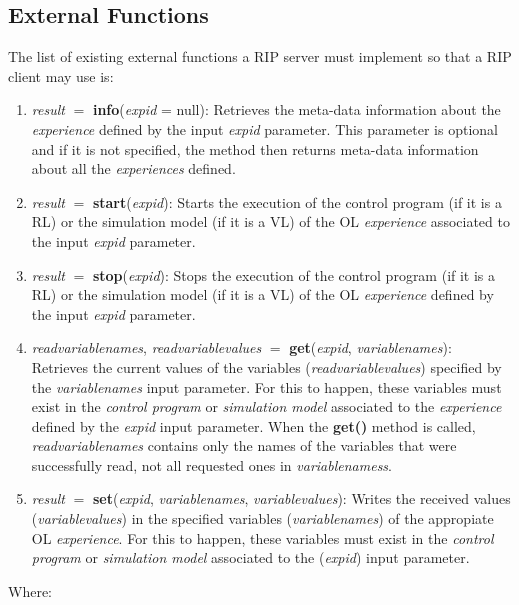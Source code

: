 \subsection{External Functions}
\label{sec:External_Functions}
The list of existing external functions a RIP server must implement so that a RIP client may use is:

\begin{enumerate}
    \item \textit{result} $=$ \textbf{info}(\textit{expid} = null): Retrieves the meta-data information about the \textit{experience} defined by the input \textit{expid} parameter.  This parameter is optional and if it is not specified, the method then returns meta-data information about all the \textit{experiences} defined.
    \item \textit{result} $=$ \textbf{start}(\textit{expid}): Starts the execution of the control program (if it is a RL) or the simulation model (if it is a VL) of the OL \textit{experience} associated to the input \textit{expid} parameter.
    \item \textit{result} $=$ \textbf{stop}(\textit{expid}): Stops the execution of the control program (if it is a RL) or the simulation model (if it is a VL) of the OL \textit{experience} defined by the input \textit{expid} parameter.
    \item \textit{readvariablenames}, \textit{readvariablevalues} $=$ \textbf{get}(\textit{expid}, \textit{variablenames}): Retrieves the current values of the variables (\textit{readvariablevalues}) specified by the \textit{variablenames} input parameter. For this to happen, these variables must exist in the \textit{control program} or \textit{simulation model} associated to the \textit{experience} defined by the \textit{expid} input parameter. When the \textbf{get()} method is called, \textit{readvariablenames} contains only the names of the variables that were successfully read, not all requested ones in \textit{variablenamess}.
    \item \textit{result} $=$ \textbf{set}(\textit{expid}, \textit{variablenames}, \textit{variablevalues}): Writes the received values (\textit{variablevalues}) in the specified variables (\textit{variablenames}) of the appropiate OL \textit{experience}. For this to happen, these variables must exist in the \textit{control program} or \textit{simulation model} associated to the (\textit{expid}) input parameter.
\end{enumerate}

Where:

